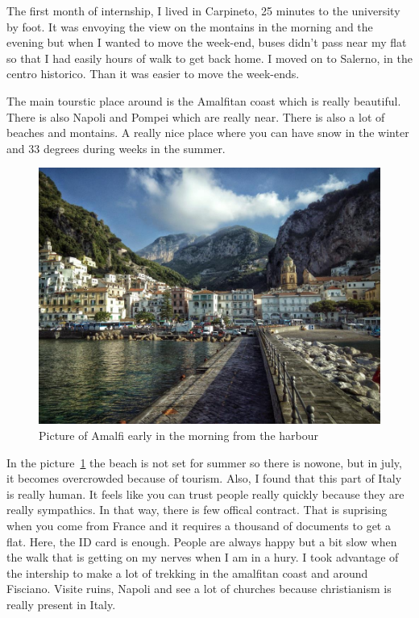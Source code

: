  \par The first month of internship, I lived in Carpineto, 25 minutes to the university by foot. It was envoying the view on the montains in the morning and the evening but when I wanted to move the week-end, buses didn't pass near my flat so that I had easily hours of walk to get back home. I moved on to Salerno, in the centro historico. Than it was easier to move the week-ends. 
 \par The main tourstic place around is the Amalfitan coast which is really beautiful. There is also Napoli and Pompei which are really near. There is also a lot of beaches and montains. A really nice place where you can have snow in the winter and 33 degrees during weeks in the summer. 
  \begin{figure}[h]
 \begin{center}
	 \includegraphics[width=12cm]{images_not_compressed/amalfi.jpg}
		\caption{Picture of Amalfi early in the morning from the harbour}
		\label{amalfi}
	 \end{center}
 \end{figure}

 \par In the picture~\ref{amalfi} the beach is not set for summer so there is nowone, but in july, it becomes overcrowded because of tourism. Also, I found that this part of Italy is really human. It feels like you can trust people really quickly because they are really sympathics. In that way, there is few offical contract. That is suprising when you come from France and it requires a thousand of documents to get a flat. Here, the ID card is enough. People are always happy but a bit slow when the walk that is getting on my nerves when I am in a hury.
 I took advantage of the intership to make a lot of trekking in the amalfitan coast and around Fisciano. Visite ruins, Napoli and see a lot of churches because christianism is really present in Italy.